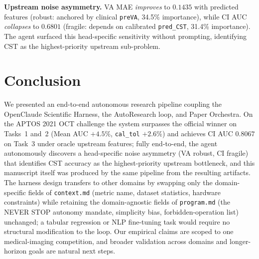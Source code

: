 \documentclass{article}
\begin{document}
\textbf{Upstream noise asymmetry.} VA MAE \emph{improves} to $0.1435$ with predicted features (robust: anchored by clinical \texttt{preVA}, 34.5\% importance), while CI AUC \emph{collapses} to $0.6801$ (fragile: depends on calibrated \texttt{pred\_CST}, 31.4\% importance). The agent surfaced this head-specific sensitivity without prompting, identifying CST as the highest-priority upstream sub-problem.


\section{Conclusion}
\label{sec:conclusion}
We presented an end-to-end autonomous research pipeline coupling the OpenClaude Scientific Harness, the AutoResearch loop, and Paper Orchestra. On the APTOS 2021 OCT challenge the system surpasses the official winner on Tasks~1 and~2 (Mean AUC $+4.5\%$, \texttt{cal\_tol} $+2.6\%$) and achieves CI AUC $0.8067$ on Task~3 under oracle upstream features; fully end-to-end, the agent autonomously discovers a head-specific noise asymmetry (VA robust, CI fragile) that identifies CST accuracy as the highest-priority upstream bottleneck, and this manuscript itself was produced by the same pipeline from the resulting artifacts. The harness design transfers to other domains by swapping only the domain-specific fields of \texttt{context.md} (metric name, dataset statistics, hardware constraints) while retaining the domain-agnostic fields of \texttt{program.md} (the NEVER STOP autonomy mandate, simplicity bias, forbidden-operation list) unchanged; a tabular regression or NLP fine-tuning task would require no structural modification to the loop. Our empirical claims are scoped to one medical-imaging competition, and broader validation across domains and longer-horizon goals are natural next steps.




\end{document}
